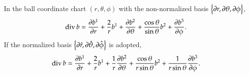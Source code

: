 \documentclass[11pt, a4paper]{book}
\begin{document}
\begin{enumerate}
  In the ball coordinate chart $(r,\theta,\phi)$ with the non-normalized basis $\left\{
    \boldsymbol{\partial}r, \boldsymbol{\partial}\theta, \boldsymbol{\partial}\phi \right\}$,
  \begin{equation}
    \label{eq:div-expr-ball-coordinate-nonnormalized-basis}
    \operatorname{div} b = \frac{\partial b^{1}}{\partial r} + \frac{2}{r}b^1 + \frac{\partial
      b^{2}}{\partial \theta} + \frac{\cos\theta}{\sin\theta}b^2 + \frac{\partial b^{3}}{\partial
      \phi}. 
  \end{equation}
 If the normalized basis $\left\{ \boldsymbol{\partial}\hat{r}, \boldsymbol{\partial}\hat{\theta},
   \boldsymbol{\partial}\hat{\phi} \right\}$ is adopted,
 \begin{equation}
   \label{eq:div-expr-ball-coordinate-normalized-basis}
   \operatorname{div} b = \frac{\partial b^{1}}{\partial r} + \frac{2}{r}b^1 +
   \frac{1}{r}\frac{\partial b^{2}}{\partial \theta} + \frac{\cos\theta}{r\sin\theta}b^2 +
   \frac{1}{r\sin\theta}\frac{\partial b^{3}}{\partial \phi}.
 \end{equation}


\end{enumerate}
\end{document}
